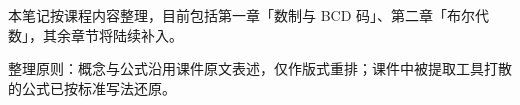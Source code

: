 本笔记按课程内容整理，目前包括第一章「数制与 BCD 码」、第二章「布尔代数」，其余章节将陆续补入。

整理原则：概念与公式沿用课件原文表述，仅作版式重排；课件中被提取工具打散的公式已按标准写法还原。
